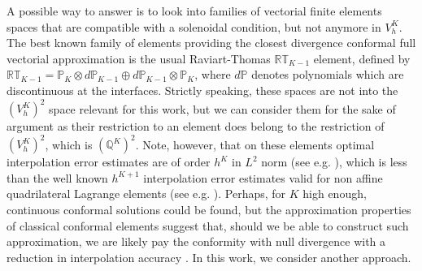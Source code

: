 \documentclass[a4paper,10pt]{article}
\begin{document}
	A possible way to  answer is to look into %
	families of vectorial  finite elements spaces that are compatible with a solenoidal condition, but not anymore in $V_h^K$. The best known family of elements providing the closest divergence conformal full vectorial approximation is the usual Raviart-Thomas $\mathbb{RT}_{K-1}$ element, defined by $\mathbb{RT}_{K-1}=\mathbb{P}_{K}\otimes d\mathbb{P}_{K-1}\oplus d\mathbb{P}_{K-1}\otimes\mathbb{P}_{K}$, where $d\mathbb P$ denotes polynomials which are discontinuous at the interfaces. Strictly speaking,   these spaces are not into the $(V_h^K)^2$ space relevant for this work, but we can consider them for the sake of argument
	as their restriction to an element does belong to the restriction of  $(V_h^K)^2$, which is $(\mathbb{Q}^K)^2$.
Note, however, that on these elements optimal interpolation error estimates are of order $h^{K}$ in $L^2$ norm (see e.g. \cite[Chapter 1]{brezzifortin}), 
which is less than the well known $h^{K+1}$ interpolation error estimates valid for non affine quadrilateral Lagrange elements (see e.g. \cite[Chapter 1]{eg04}).
Perhaps, for $K$ high enough, continuous conformal solutions could be found, but 
the approximation properties of classical conformal elements suggest that, should we be able to construct such approximation, 
we are likely pay the conformity with  null divergence with a reduction in interpolation accuracy  \cite{brezzifortin,Arbogast16}.
In this work, we consider another approach.

%
\end{document}
